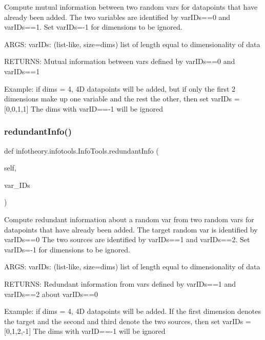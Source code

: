 \begin{DoxyVerb}Compute mutual information between two random vars for datapoints that have already been added.
The two variables are identified by varIDs==0 and varIDs==1.
Set varIDs=-1 for dimensions to be ignored.

ARGS:
varIDs: (list-like, size=dims) list of length equal to dimensionality of data

RETURNS:
Mutual information between vars defined by varIDs==0 and varIDs==1

Example:
if dims = 4, 4D datapoints will be added, but if only the first 2 dimensions make up one variable and the rest the other, then set
varIDs = [0,0,1,1]
The dims with varID==-1 will be ignored
\end{DoxyVerb}
 \mbox{\label{classinfotheory_1_1infotools_1_1_info_tools_a865054984e7894a8e4852f6ac26fad98}} 
\subsubsection{\texorpdfstring{redundant\+Info()}{redundantInfo()}}
{\footnotesize\ttfamily def infotheory.\+infotools.\+Info\+Tools.\+redundant\+Info (\begin{DoxyParamCaption}\item[{}]{self,  }\item[{}]{var\+\_\+\+I\+Ds }\end{DoxyParamCaption})}

\begin{DoxyVerb}Compute redundant information about a random var from two random vars for datapoints that have already been added.
The target random var is identified by varIDs==0
The two sources are identified by varIDs==1 and varIDs==2.
Set varIDs=-1 for dimensions to be ignored.

ARGS:
varIDs: (list-like, size=dims) list of length equal to dimensionality of data

RETURNS:
Redundant information from vars defined by varIDs==1 and varIDs==2 about varIDs==0

Example:
if dims = 4, 4D datapoints will be added. If the first dimension denotes the target and the second and third denote the two sources, then set
varIDs = [0,1,2,-1]
The dims with varID==-1 will be ignored
\end{DoxyVerb}
 \mbox{\label{classinfotheory_1_1infotools_1_1_info_tools_a752b75f1a367372d02edc0d1bf1b78ec}} 
